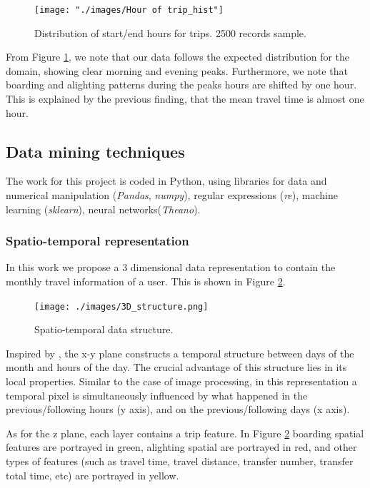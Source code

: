 \documentclass{article}
\begin{document}
\begin{figure}[H]
  \centering
  \texttt{[image: "./images/Hour of trip\_hist"]}
  \caption{Distribution of start/end hours for trips. 2500 records sample.}
  \label{fig:preprocessing/start_end_hour}
\end{figure}

From Figure \ref{fig:preprocessing/start_end_hour}, we note that our data follows the expected distribution for the domain, showing clear morning and evening peaks. Furthermore, we note that boarding and alighting patterns during the peaks hours are shifted by one hour. This is explained by the previous finding, that the mean travel time is almost one hour.

\subsection{Data mining techniques}
The work for this project is coded in Python, using libraries for data and numerical manipulation (\textit{Pandas}, \textit{numpy}), regular expressions (\textit{re}), machine learning (\textit{sklearn}), neural networks(\textit{Theano}).

\subsubsection{Spatio-temporal representation}
In this work we propose a 3 dimensional data representation to contain the monthly travel information of a user. This is shown in Figure \ref{fig:data_mining/3D_structure}.

\begin{figure}[H]
  \centering
  \texttt{[image: ./images/3D\_structure.png]}
  \caption{Spatio-temporal data structure.}
  \label{fig:data_mining/3D_structure}
\end{figure}

Inspired by \cite{langlois2016inferring}, the x-y plane constructs a temporal structure between days of the month and hours of the day. The crucial advantage of this structure lies in its local properties. Similar to the case of image processing, in this representation a temporal pixel is simultaneously influenced by what happened in the previous/following hours (y axis), and on the previous/following days (x axis).

As for the z plane, each layer contains a trip feature. In Figure \ref{fig:data_mining/3D_structure} boarding spatial features are portrayed in green, alighting spatial are portrayed in red, and other types of features (such as travel time, travel distance, transfer number, transfer total time, etc) are portrayed in yellow. 
\end{document}
